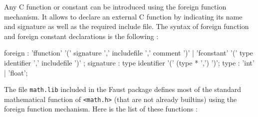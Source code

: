 \documentclass{article}
\begin{document}
Any C function or constant can be introduced using the foreign function mechanism.
It allows to declare an external C function by indicating its name and signature as well as the required include file.
The syntax of foreign function and foreign constant declarations is the following :

\begin{rail}
foreign : 'ffunction' '(' signature ',' includefile ',' comment ')' | 'fconstant' '(' type identifier ',' includefile ')' ;
signature : type identifier '(' (type * ',') ')';
type : 'int' | 'float';
\end{rail}


The file \texttt{math.lib} included in the Faust package defines most of the standard mathematical function of
\texttt{<math.h>} (that are not already builtins) using the foreign function mechanism.
Here is the list of these functions :

\vspace{5 mm}
\end{document}
